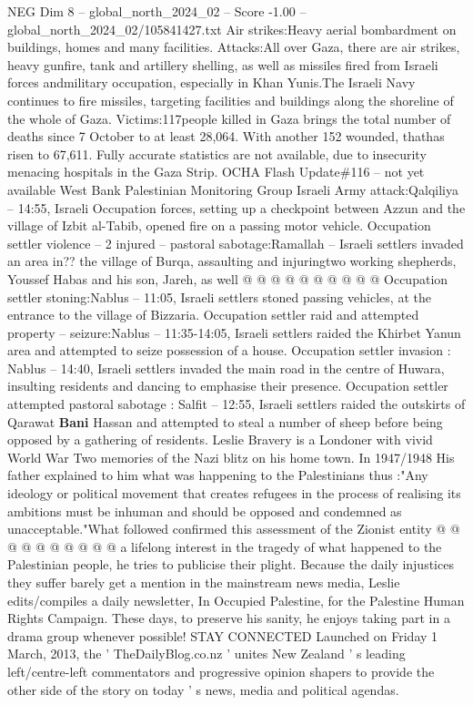 \begin{textsample}{NEG Dim 8 – global\_north\_2024\_02 – Score -1.00 – global\_north\_2024\_02/105841427.txt}  \label{ex:f8_neg_437}
Air strikes:Heavy aerial bombardment on buildings, homes and many facilities.
Attacks:All over Gaza, there are air strikes, heavy gunfire, tank and artillery shelling, as well as missiles fired from Israeli forces andmilitary occupation, especially in Khan Yunis.The Israeli Navy continues to fire missiles, targeting facilities and buildings along the shoreline of the whole of Gaza.
Victims:117people killed in Gaza brings the total number of deaths since 7 October to at least 28,064.
With another 152 wounded, thathas risen to 67,611.
Fully accurate statistics are not available, due to insecurity menacing hospitals in the Gaza Strip.
OCHA Flash Update\#116 -- not yet available West Bank Palestinian Monitoring Group Israeli Army attack:Qalqiliya -- 14:55, Israeli Occupation forces, setting up a checkpoint between Azzun and the village of Izbit al-Tabib, opened fire on a passing motor vehicle.
Occupation settler violence -- 2 injured -- pastoral sabotage:Ramallah -- Israeli settlers invaded an area in?? the village of Burqa, assaulting and injuringtwo working shepherds, Youssef Habas and his son, Jareh, as well @ @ @ @ @ @ @ @ @ @ Occupation settler stoning:Nablus -- 11:05, Israeli settlers stoned passing vehicles, at the entrance to the village of Bizzaria.
Occupation settler raid and attempted property -- seizure:Nablus -- 11:35-14:05, Israeli settlers raided the Khirbet Yanun area and attempted to seize possession of a house.
Occupation settler invasion : Nablus -- 14:40, Israeli settlers invaded the main road in the centre of Huwara, insulting residents and dancing to emphasise their presence.
Occupation settler attempted pastoral sabotage : Salfit -- 12:55, Israeli settlers raided the outskirts of Qarawat \textbf{Bani} Hassan and attempted to steal a number of sheep before being opposed by a gathering of residents.
Leslie Bravery is a Londoner with vivid World War Two memories of the Nazi blitz on his home town.
In 1947/1948 His father explained to him what was happening to the Palestinians thus :"Any ideology or political movement that creates refugees in the process of realising its ambitions must be inhuman and should be opposed and condemned as unacceptable."What followed confirmed this assessment of the Zionist entity @ @ @ @ @ @ @ @ @ @ a lifelong interest in the tragedy of what happened to the Palestinian people, he tries to publicise their plight.
Because the daily injustices they suffer barely get a mention in the mainstream news media, Leslie edits/compiles a daily newsletter, In Occupied Palestine, for the Palestine Human Rights Campaign.
These days, to preserve his sanity, he enjoys taking part in a drama group whenever possible!
STAY CONNECTED Launched on Friday 1 March, 2013, the ' TheDailyBlog.co.nz ' unites New Zealand ' s leading left/centre-left commentators and progressive opinion shapers to provide the other side of the story on today ' s news, media and political agendas.

\end{textsample}
